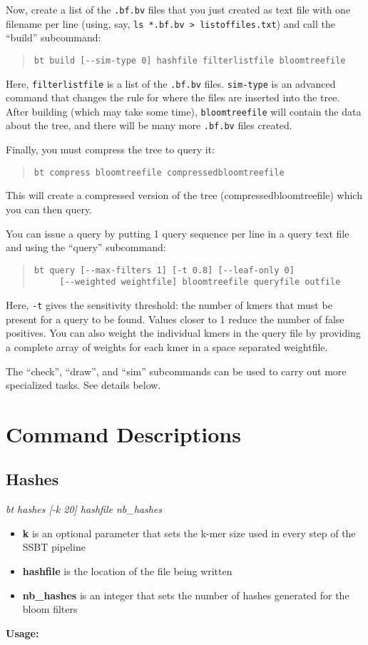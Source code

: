 \documentclass{article}
\begin{document}
Now, create a list of the \verb+.bf.bv+ files that you just created as text file with one filename per line (using, say, \verb+ls *.bf.bv > listoffiles.txt+) and call the ``build'' subcommand:
\begin{quote}
\begin{verbatim}
bt build [--sim-type 0] hashfile filterlistfile bloomtreefile
\end{verbatim}
\end{quote}
Here, \verb+filterlistfile+ is a list of the \verb+.bf.bv+ files. \verb+sim-type+ is an advanced command that changes the rule for where the files are inserted into the tree. After building (which may take some time), \verb+bloomtreefile+ will contain the data about the tree, and there will be many more \verb+.bf.bv+ files created. 

Finally, you must compress the tree to query it:
\begin{quote}
\begin{verbatim}
bt compress bloomtreefile compressedbloomtreefile
\end{verbatim}
\end{quote}
This will create a compressed version of the tree (compressedbloomtreefile) which you can then query.

You can issue a query by putting 1 query sequence per line in a query text file and using the ``query'' subcommand:
\begin{quote}
\begin{lstlisting}
bt query [--max-filters 1] [-t 0.8] [--leaf-only 0] 
	 [--weighted weightfile] bloomtreefile queryfile outfile
\end{lstlisting}
\end{quote}
Here, \verb+-t+ gives the sensitivity threshold: the number of kmers that must be present for a query to be found. Values closer to 1 reduce the number of false positives. You can also weight the individual kmers in the query file by providing a complete array of weights for each kmer in a space separated weightfile.

The ``check'', ``draw'', and ``sim'' subcommands can be used to carry out more specialized tasks. See details below.

\section{Command Descriptions}

\subsection{Hashes} 
\textit{bt hashes [-k 20] hashfile nb\_hashes}
\begin{itemize}
\item \textbf{k} is an optional parameter that sets the k-mer size used in every step of the SSBT pipeline
\item \textbf{hashfile} is the location of the file being written
\item \textbf{nb\_hashes} is an integer that sets the number of hashes generated for the bloom filters
\end{itemize}
\textbf{Usage:}
\end{document}
